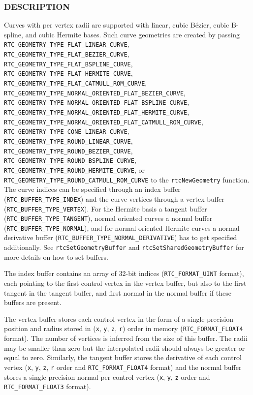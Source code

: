 \subsubsection{DESCRIPTION}\label{description}

Curves with per vertex radii are supported with linear, cubic Bézier,
cubic B-spline, and cubic Hermite bases. Such curve geometries are
created by passing \texttt{RTC\_GEOMETRY\_TYPE\_FLAT\_LINEAR\_CURVE},
\texttt{RTC\_GEOMETRY\_TYPE\_FLAT\_BEZIER\_CURVE},
\texttt{RTC\_GEOMETRY\_TYPE\_FLAT\_BSPLINE\_CURVE},
\texttt{RTC\_GEOMETRY\_TYPE\_FLAT\_HERMITE\_CURVE},
\texttt{RTC\_GEOMETRY\_TYPE\_FLAT\_CATMULL\_ROM\_CURVE},
\texttt{RTC\_GEOMETRY\_TYPE\_NORMAL\_ORIENTED\_FLAT\_BEZIER\_CURVE},
\texttt{RTC\_GEOMETRY\_TYPE\_NORMAL\_ORIENTED\_FLAT\_BSPLINE\_CURVE},
\texttt{RTC\_GEOMETRY\_TYPE\_NORMAL\_ORIENTED\_FLAT\_HERMITE\_CURVE},
\texttt{RTC\_GEOMETRY\_TYPE\_NORMAL\_ORIENTED\_FLAT\_CATMULL\_ROM\_CURVE},
\texttt{RTC\_GEOMETRY\_TYPE\_CONE\_LINEAR\_CURVE},
\texttt{RTC\_GEOMETRY\_TYPE\_ROUND\_LINEAR\_CURVE},
\texttt{RTC\_GEOMETRY\_TYPE\_ROUND\_BEZIER\_CURVE},
\texttt{RTC\_GEOMETRY\_TYPE\_ROUND\_BSPLINE\_CURVE},
\texttt{RTC\_GEOMETRY\_TYPE\_ROUND\_HERMITE\_CURVE}, or
\texttt{RTC\_GEOMETRY\_TYPE\_ROUND\_CATMULL\_ROM\_CURVE} to the
\texttt{rtcNewGeometry} function. The curve indices can be specified
through an index buffer (\texttt{RTC\_BUFFER\_TYPE\_INDEX}) and the
curve vertices through a vertex buffer
(\texttt{RTC\_BUFFER\_TYPE\_VERTEX}). For the Hermite basis a tangent
buffer (\texttt{RTC\_BUFFER\_TYPE\_TANGENT}), normal oriented curves a
normal buffer (\texttt{RTC\_BUFFER\_TYPE\_NORMAL}), and for normal
oriented Hermite curves a normal derivative buffer
(\texttt{RTC\_BUFFER\_TYPE\_NORMAL\_DERIVATIVE}) has to get specified
additionally. See \texttt{rtcSetGeometryBuffer} and
\texttt{rtcSetSharedGeometryBuffer} for more details on how to set
buffers.

The index buffer contains an array of 32-bit indices
(\texttt{RTC\_FORMAT\_UINT} format), each pointing to the first control
vertex in the vertex buffer, but also to the first tangent in the
tangent buffer, and first normal in the normal buffer if these buffers
are present.

The vertex buffer stores each control vertex in the form of a single
precision position and radius stored in (\texttt{x}, \texttt{y},
\texttt{z}, \texttt{r}) order in memory (\texttt{RTC\_FORMAT\_FLOAT4}
format). The number of vertices is inferred from the size of this
buffer. The radii may be smaller than zero but the interpolated radii
should always be greater or equal to zero. Similarly, the tangent buffer
stores the derivative of each control vertex (\texttt{x}, \texttt{y},
\texttt{z}, \texttt{r} order and \texttt{RTC\_FORMAT\_FLOAT4} format)
and the normal buffer stores a single precision normal per control
vertex (\texttt{x}, \texttt{y}, \texttt{z} order and
\texttt{RTC\_FORMAT\_FLOAT3} format).

